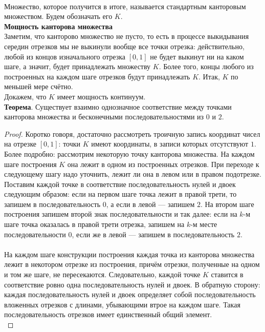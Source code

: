 \documentclass{report}
\begin{document}
 \\ 

Множество, которое получится в итоге, называется стандартным канторовым множеством. Будем обозначать его $K$.\\

\textbf{Мощность канторова множества} \\
Заметим, что канторово множество не пусто, то есть в процессе выкидывания середин отрезков мы не выкинули вообще все точки отрезка: действительно, любой из концов изначального отрезка $[0,1]$ не будет выкинут ни на каком шаге, а значит, будет принадлежать множеству $K$. Более того, концы любого из построенных на каждом шаге отрезков будут принадлежать $K$. Итак, $K$ по меньшей мере счётно.\\ 

Докажем, что $K$ имеет мощность континуум.\\

\textbf{Теорема}. Существует взаимно однозначное соответствие между точками канторова множества и бесконечными последовательностями из $0$ и $2$.\\

\begin{proof} Коротко говоря, достаточно рассмотреть троичную запись координат чисел на отрезке $[0,1]$: точки $K$ имеют координаты, в записи которых отсутствуют $1$.\\

Более подробно: рассмотрим некоторую точку канторова множества. На каждом шаге построения $K$ она лежит в одном из построенных отрезков. При переходе к следующему шагу надо уточнить, лежит ли она в левом или в правом подотрезке. Поставим каждой точке в соответствие последовательность нулей и двоек следующим образом: если на первом шаге точка лежит в правой трети, то запишем в последовательность $0$, а если в левой — запишем $2$. На втором шаге построения запишем второй знак последовательности и так далее: если на $k$-м шаге точка оказалась в правой трети отрезка, запишем на $k$-м месте последовательности $0$, если же в левой — запишем в последовательность $2$.\\

\\

На каждом шаге конструкции построения каждая точка из канторова множества лежит в некотором отрезке из построения, причём отрезки, полученные на одном и том же шаге, не пересекаются. Следовательно, каждой точке $K$ ставится в соответствие ровно одна последовательность нулей и двоек. В обратную сторону: каждая последовательность нулей и двоек определяет собой последовательность вложенных отрезков с длинами, убывающими втрое на каждом шаге. Такая последовательность отрезков имеет единственный общий элемент. \\
\end{proof}
\end{document}
